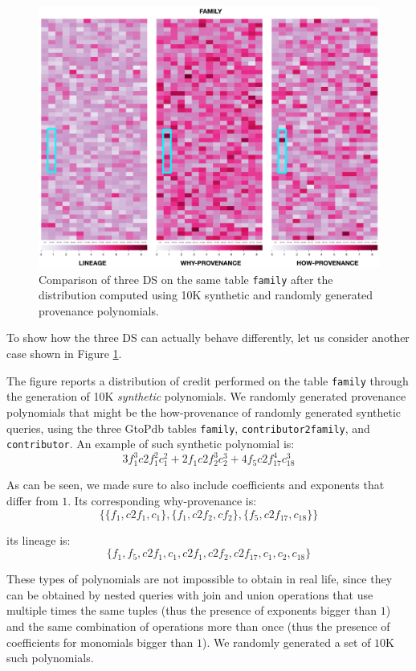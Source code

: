 \begin{figure}[tb]
  \includegraphics[width=1\textwidth]{figures/synthetic_polynomials}
  \caption{Comparison of three DS on the same table \texttt{family} after the distribution computed using 10K synthetic and randomly generated provenance polynomials.}
  \label{figure:comparison_on_synthetic_polynomials_2}
\end{figure}

To show how the three DS can actually behave differently, let us consider another case shown in Figure \ref{figure:comparison_on_synthetic_polynomials_2}. 


The figure reports a distribution of credit performed on the table \texttt{family} through the generation of 10K \emph{synthetic} polynomials. 
We randomly generated provenance polynomials that might be the how-provenance of randomly generated synthetic queries, using the three GtoPdb tables \texttt{family}, \texttt{contributor2family}, and \texttt{contributor}. 
An example of such synthetic polynomial is:
{\footnotesize
\[
3 f_1^3 c2f_1^2 c_1^2 + 2 f_1 c2f_2^3 c_2^3 + 4 f_5 c2f_{17}^4 c_{18}^3
\] }

As can be seen, we made sure to also include coefficients and exponents that differ from $1$.
Its corresponding why-provenance is: 
{\footnotesize
\[
\{ \{f_1, c2f_1, c_1\}, \{f_1, c2f_2, cf_2\}, \{ f_5, c2f_{17}, c_{18}\} \}
\] 
}

its lineage is: 
{\footnotesize
\[
\{f_1, f_5, c2f_1, c_1, c2f_1, c2f_2, c2f_{17}, c_1, c_2, c_{18} \}
\]
 }
 
These types of polynomials are not impossible to obtain in real life, since they can be obtained by nested queries with join and union operations that use multiple times the same tuples (thus the presence of exponents bigger than $1$) and the same combination of operations more than once (thus the presence of coefficients for monomials bigger than $1$). 
We randomly generated a set of $10$K such polynomials. 

